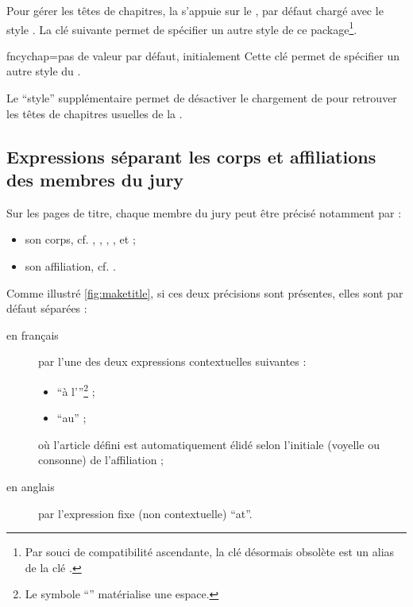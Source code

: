 Pour gérer les têtes de chapitres, la \yatcl{} s'appuie sur le
, par défaut chargé avec le style . La
clé  suivante permet de spécifier un autre style de ce
package\footnote{Par souci de compatibilité ascendante, la clé désormais
  obsolète  est un alias de la clé
  .}.%
%
{%
  \begin{docKey}{fncychap}{=\textbar{}\textbar{}\textbar{}\textbar{}\textbar{}\textbar{}\textbar{}\textbar{}}{pas
      de valeur par défaut, initialement }
    Cette clé permet de spécifier un autre style du .

    Le \enquote{style} supplémentaire  permet de désactiver le
    chargement de  pour retrouver les têtes de chapitres
    usuelles de la .
  \end{docKey}
}

\subsection{Expressions séparant les corps et affiliations des membres du jury}
\label{sec:expr-separ-les}

Sur les pages de titre, chaque membre du jury peut être précisé notamment par :
\begin{itemize}
\item son corps, cf. , , ,
  ,  et
   ;
\item son affiliation, cf. .
\end{itemize}
Comme illustré \vref{fig:maketitle}, si ces deux précisions sont présentes,
elles sont par défaut séparées :
\begin{description}
\item[en français] par l'une des deux expressions contextuelles suivantes :
  \begin{itemize}
  \item \enquote{\textvisiblespace{}à l'}\footnote{Le symbole
      \enquote{\textvisiblespace{}} matérialise une espace.} ;
  \item \enquote{\textvisiblespace{}au\textvisiblespace{}} ;
  \end{itemize}
  où l'article défini est automatiquement élidé selon l'initiale (voyelle ou
  consonne) de l'affiliation ;
\item[en anglais] par l'expression fixe (non contextuelle)
  \enquote{\textvisiblespace{}at\textvisiblespace{}}.
\end{description}

